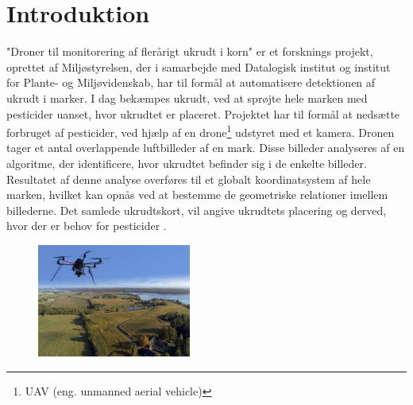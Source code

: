 \chapter{Introduktion} \label{sec:intro}
"Droner til monitorering af flerårigt ukrudt i korn"$ $ er et forsknings projekt, oprettet af Miljøstyrelsen, der i samarbejde med Datalogisk institut og institut for Plante- og Miljøvidenskab, har til formål at automatisere detektionen af ukrudt i marker. I dag bekæmpes ukrudt, ved at sprøjte hele marken med pesticider uanset, hvor ukrudtet er placeret. Projektet har til formål at nedsætte forbruget af pesticider, ved hjælp af en drone\footnote{UAV (eng. unmanned aerial vehicle)} udstyret med et kamera. Dronen tager et antal overlappende luftbilleder af en mark. Disse billeder analyseres af en algoritme, der identificere, hvor ukrudtet befinder sig i de enkelte billeder. Resultatet af denne analyse overføres til et globalt koordinatsystem af hele marken, hvilket kan opnås ved at bestemme de geometriske relationer imellem billederne. Det samlede ukrudtskort, vil angive ukrudtets placering og derved, hvor der er behov for pesticider \cite{drone}.
\begin{figure}[H]
    \centering
    \includegraphics[width=0.45\textwidth]{fig/drone4.jpg}
     \vspace{-0.5em}
    \begin{center}    
    \label{fig:difference}
     \end{center}
     \vspace{-3em}
  \end{figure} \noindent
